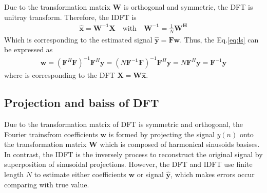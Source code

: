 Due to the transformation matrix $\mathbf{W}$ is orthogonal and symmetric, the DFT is unitray transform. Therefore, the IDFT is 
\begin{align}
\mathbf{\hat x=W^{-1}X}\quad \text{with}\quad \mathbf{W^{-1}}=\frac{1}{N}\mathbf{W^H}
\end{align}
Which is corresponding to the estimated signal $\mathbf {\hat y}=\mathbf{F}\mathbf{w}$. Thus, the Eq.\ref{eq:ls} can be expressed as
\begin{align}
\mathbf{w}
=(\mathbf{F}^H\mathbf{F})^{-1}\mathbf{F}^H\mathbf{y}
=(N\mathbf{F^{-1}F})^{-1}\mathbf{F}^H\mathbf{y}
=N\mathbf{F}^H\mathbf{y}
=\mathbf F^{-1}\mathbf{y}
\end{align}
where is corresponding to the DFT $\mathbf{X=W\hat x}$.
\subsection{Projection and baiss of DFT}
Due to the transformation matrix of DFT is symmetric and orthogonal, the Fourier trainsfrom coefficients $\mathbf{w}$ is formed by projecting the signal $y(n)$ onto the transformation matrix $\mathbf{W}$ which is composed of harmonical sinusoids basises. In contrast, the IDFT is the inversely process to reconstruct the original signal by superposition of sinusoidal projections. However, the DFT and IDFT use finite length $N$ to estimate either coefficients $\mathbf{w}$ or signal $\mathbf{\hat y}$, which makes errors occur comparing with true value.
